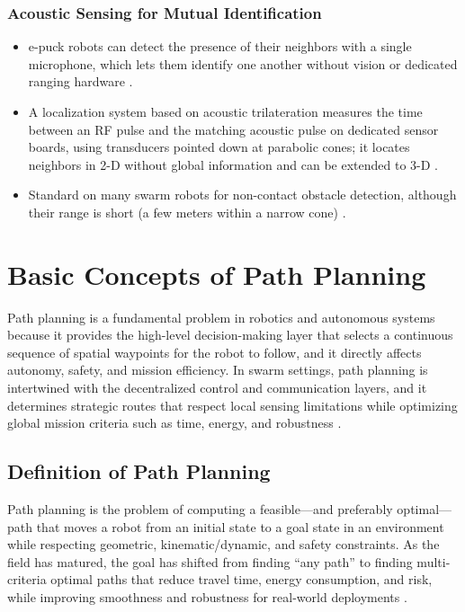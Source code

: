 \subsubsection{Acoustic Sensing for Mutual Identification}

\begin{itemize}
  \item {} e-puck robots can detect the
        presence of their neighbors with a single microphone, which lets them
        identify one another without vision or dedicated ranging hardware
        \cite{nemec2017mutual}.
  \item {} A localization system based on acoustic
        trilateration measures the time between an RF pulse and the matching
        acoustic pulse on dedicated sensor boards, using transducers pointed down
        at parabolic cones; it locates neighbors in 2-D without global
        information and can be extended to 3-D \cite{sahin2007swarm}.
  \item {} Standard on many swarm robots for non-contact
        obstacle detection, although their range is short (a few meters within
        a narrow cone) \cite{tan2016handbook}.
\end{itemize}

\section{Basic Concepts of Path Planning}\label{sec:path-planning-basics}

Path planning is a fundamental problem in robotics and autonomous systems because
it provides the high-level decision-making layer that selects a continuous
sequence of spatial waypoints for the robot to follow, and it directly affects
autonomy, safety, and mission efficiency. In swarm settings, path planning is
intertwined with the decentralized control and communication layers, and it
determines strategic routes that respect local sensing limitations while
optimizing global mission criteria such as time, energy, and robustness
\cite{nguyen2024swarm}.

\subsection{Definition of Path Planning}

Path planning is the problem of computing a feasible---and preferably
optimal---path that moves a robot from an initial state to a goal state in an
environment while respecting geometric, kinematic/dynamic, and safety
constraints. As the field has matured, the goal has shifted from finding ``any
path'' to finding multi-criteria optimal paths that reduce travel time, energy
consumption, and risk, while improving smoothness and robustness for real-world
deployments \cite{nguyen2024swarm}.

